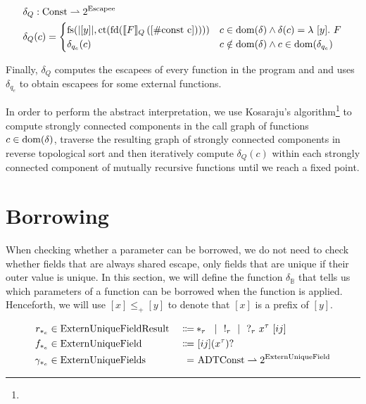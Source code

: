 \begin{align*}
	\delta_Q &: \mathrlap{\Const \rightharpoonup 2^{\Escapee}} \\
	\delta_Q&(c) = \begin{cases}
		\fs(|[y]|, \ct(\fd(\ecp{F}{[\#\text{const c}]}))) & c \in \dom(\delta) \land \delta(c) = \lambda\ [y].\ F \\
		\delta_{q_e}(c) & c \notin \dom(\delta) \land c \in \dom(\delta_{q_e})
	\end{cases}
\end{align*}

Finally, $\delta_Q$ computes the escapees of every function in the program and and uses $\delta_{q_e}$ to obtain escapees for some external functions.

In order to perform the abstract interpretation, we use Kosaraju's algorithm\footnote{} to compute strongly connected components in the call graph of functions $c \in \mathrm{dom}(\delta)$, traverse the resulting graph of strongly connected components in reverse topological sort and then iteratively compute $\delta_Q(c)$ within each strongly connected component of mutually recursive functions until we reach a fixed point.

\section{Borrowing}\label{sec:borrowing}
When checking whether a parameter can be borrowed, we do not need to check whether fields that are always shared escape, only fields that are unique if their outer value is unique. In this section, we will define the function $\delta_\mathbb{B}$ that tells us which parameters of a function can be borrowed when the function is applied. Henceforth, we will use $[x] \leq_+ [y]$ to denote that $[x]$ is a prefix of $[y]$.

\newcommand{\ExternUniqueFieldResult}{\mathrm{ExternUniqueFieldResult}}
\newcommand{\ExternUniqueField}{\mathrm{ExternUniqueField}}
\newcommand{\ExternUniqueFields}{\mathrm{ExternUniqueFields}}

\begin{alignat*}{3}
	r_{*_e} &\in \ExternUniqueFieldResult\ &\Coloneqq& *_r \sep !_r \sep ?_r\ x^\tau\ [ij] \\
	f_{*_e} &\in \ExternUniqueField\ &\Coloneqq&\ [ij] (x^\tau)? \\
	\gamma_{*_e} &\in \ExternUniqueFields\ &=&\ \ADTConst \rightharpoonup 2^{\ExternUniqueField}
\end{alignat*}

